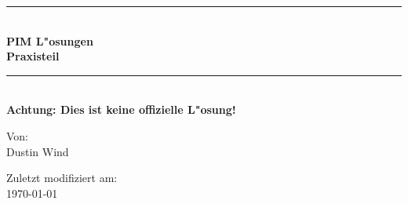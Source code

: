 \documentclass[11pt,oneside,a4wide]{report}
\newcommand{\HRule}{\rule{\linewidth}{0.5mm}}
\begin{document}
\begin{titlepage}
    \begin{center}

    \HRule \\[0.4cm]
    { \huge \bfseries PIM L"osungen\\Praxisteil\\[0.4cm] }
    \HRule \\[1.5cm]

    \textbf{Achtung: Dies ist keine offizielle L"osung!}

    \vfill
    Von:\\
    Dustin Wind


   \vfill
    Zuletzt modifiziert am:\\
    {\large \today}
    \end{center}
\end{titlepage}


\tableofcontents

%




\end{document}
